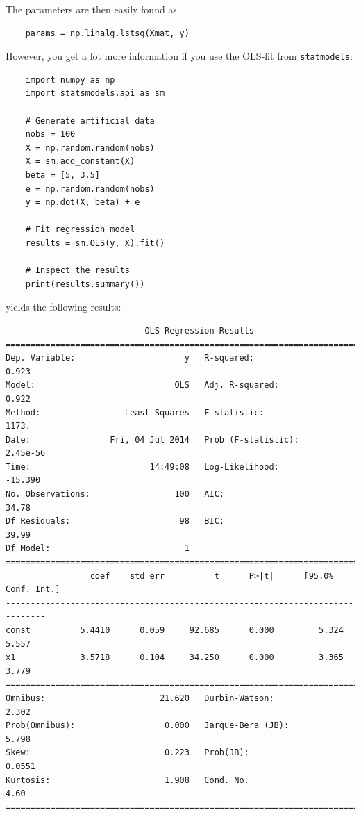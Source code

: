 The parameters are then easily found as

\begin{lstlisting}
    params = np.linalg.lstsq(Xmat, y)
\end{lstlisting}

However, you get a lot more information if you use the OLS-fit from \texttt{statmodels}:

\begin{lstlisting}
    import numpy as np
    import statsmodels.api as sm

    # Generate artificial data
    nobs = 100
    X = np.random.random(nobs)
    X = sm.add_constant(X)
    beta = [5, 3.5]
    e = np.random.random(nobs)
    y = np.dot(X, beta) + e

    # Fit regression model
    results = sm.OLS(y, X).fit()

    # Inspect the results
    print(results.summary())
\end{lstlisting}

yields the following results:

\begin{lstlisting}
                            OLS Regression Results
==============================================================================
Dep. Variable:                      y   R-squared:                       0.923
Model:                            OLS   Adj. R-squared:                  0.922
Method:                 Least Squares   F-statistic:                     1173.
Date:                Fri, 04 Jul 2014   Prob (F-statistic):           2.45e-56
Time:                        14:49:08   Log-Likelihood:                -15.390
No. Observations:                 100   AIC:                             34.78
Df Residuals:                      98   BIC:                             39.99
Df Model:                           1
==============================================================================
                 coef    std err          t      P>|t|      [95.0% Conf. Int.]
------------------------------------------------------------------------------
const          5.4410      0.059     92.685      0.000         5.324     5.557
x1             3.5718      0.104     34.250      0.000         3.365     3.779
==============================================================================
Omnibus:                       21.620   Durbin-Watson:                   2.302
Prob(Omnibus):                  0.000   Jarque-Bera (JB):                5.798
Skew:                           0.223   Prob(JB):                       0.0551
Kurtosis:                       1.908   Cond. No.                         4.60
==============================================================================
\end{lstlisting}


